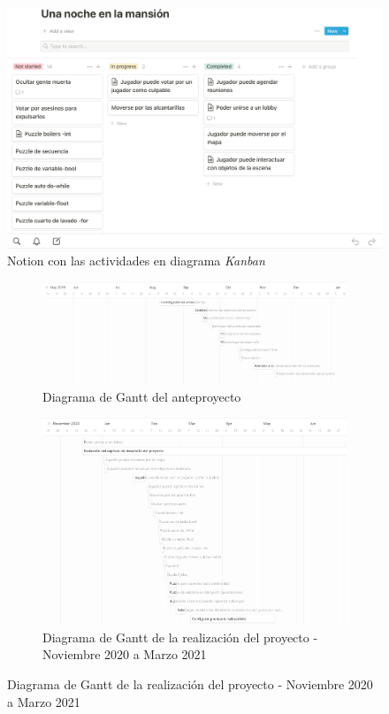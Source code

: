 \begin{figure}[H]
    \centering
    \includegraphics[width=0.8\linewidth]{images/notion.png}
    \caption{Notion con las actividades en diagrama \textit{Kanban}}
    \label{fig:notion_proyecto}
\end{figure}
\begin{figure}
    \centering
    \caption{Diagrama de Gantt del proyecto}
    \label{fig:diagrama_gantt}
    \begin{subfigure}{\textwidth}
        \centering
        \includegraphics[width=0.8\linewidth]{images/ago-dec-19.png}
        \caption{Diagrama de Gantt del anteproyecto}
        \label{fig:gantt_anteproyecto}
    \end{subfigure}
    \begin{subfigure}{\textwidth}
        \centering
        \includegraphics[width=0.8\linewidth]{images/ene-mar-21.png}
        \caption{Diagrama de Gantt de la realización del proyecto - Noviembre 2020 a Marzo 2021}
        \label{fig:gantt_proyecto}
    \end{subfigure}
\end{figure}
